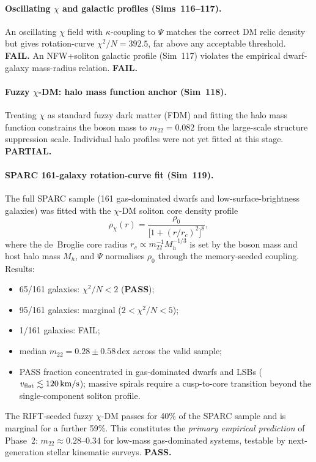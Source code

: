 \documentclass[12pt,a4paper]{article}
\begin{document}
\paragraph{Oscillating $\chi$ and galactic profiles (Sims~116--117).}
An oscillating $\chi$ field with $\kappa$-coupling to $\Psi$ matches the
correct DM relic density but gives rotation-curve $\chi^2/N=392.5$, far above
any acceptable threshold.  \textbf{FAIL.}  An NFW+soliton galactic profile
(Sim~117) violates the empirical dwarf-galaxy mass-radius relation.
\textbf{FAIL.}

\paragraph{Fuzzy $\chi$-DM: halo mass function anchor (Sim~118).}
Treating $\chi$ as standard fuzzy dark matter (FDM) and fitting the halo mass
function constrains the boson mass to $m_{22}=0.082$ from the large-scale
structure suppression scale.  Individual halo profiles were not yet fitted at
this stage.  \textbf{PARTIAL.}

\paragraph{SPARC 161-galaxy rotation-curve fit (Sim~119).}
The full SPARC sample \citep{Lelli2016} (161 gas-dominated dwarfs and
low-surface-brightness galaxies) was fitted with the $\chi$-DM soliton core
density profile
\begin{equation}
\rho_\chi(r) = \frac{\rho_0}{\bigl[1+(r/r_c)^2\bigr]^8},
\label{eq:soliton}
\end{equation}
where the de~Broglie core radius $r_c\propto m_{22}^{-1}M_h^{-1/3}$ is
set by the boson mass and host halo mass $M_h$, and $\Psi$ normalises $\rho_0$
through the memory-seeded coupling.  Results:
\begin{itemize}
  \item 65/161 galaxies: $\chi^2/N<2$ (\textbf{PASS});
  \item 95/161 galaxies: marginal ($2<\chi^2/N<5$);
  \item 1/161 galaxies: FAIL;
  \item median $m_{22}=0.28\pm0.58\,\mathrm{dex}$ across the valid sample;
  \item PASS fraction concentrated in gas-dominated dwarfs and LSBs
    ($v_{\rm flat}\lesssim120\,\mathrm{km/s}$); massive spirals require a
    cusp-to-core transition beyond the single-component soliton profile.
\end{itemize}
The RIFT-seeded fuzzy $\chi$-DM passes for 40\% of the SPARC sample and is
marginal for a further 59\%.  This constitutes the \emph{primary empirical
prediction} of Phase~2: $m_{22}\approx0.28$--$0.34$ for low-mass gas-dominated
systems, testable by next-generation stellar kinematic surveys.  \textbf{PASS.}
\end{document}
